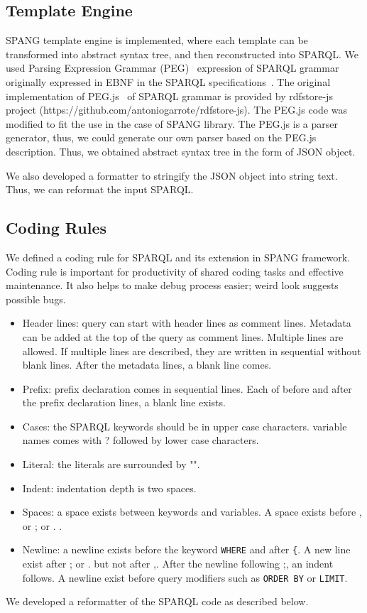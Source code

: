 \documentclass[runningheads]{llncs}
\begin{document}
\subsection{Template Engine}
SPANG template engine is implemented, where each template can be transformed into abstract syntax tree, and then reconstructed into SPARQL. 
We used Parsing Expression Grammar (PEG)~\cite{peg} expression of SPARQL grammar originally expressed in EBNF in the SPARQL specifications~\cite{sparql}. The original implementation of PEG.js~\cite{pegjs} of SPARQL grammar is provided by rdfstore-js project (https://github.com/antoniogarrote/rdfstore-js).
The PEG.js code was modified to fit the use in the case of SPANG library.
The PEG.js is a parser generator, thus, we could generate our own parser based on the PEG.js description. Thus, we obtained abstract syntax tree in the form of JSON object.

We also developed a formatter to stringify the JSON object into string text. Thus, we can reformat the input SPARQL.


\subsection{Coding Rules}
We defined a coding rule for SPARQL and its extension in SPANG framework. Coding rule is important for productivity of shared coding tasks and effective maintenance. It also helps to make debug process easier; weird look suggests possible bugs. 
\begin{itemize}
    \item Header lines: query can start with header lines as comment lines. Metadata can be added at the top of the query as comment lines. Multiple lines are allowed. If multiple lines are described, they are written in sequential without blank lines. After the metadata lines, a blank line comes.
    \item Prefix: prefix declaration comes in sequential lines. Each of before and after the prefix declaration lines, a blank line exists.
    \item Cases: the SPARQL keywords should be in upper case characters. variable names comes with ? followed by lower case characters.
    \item Literal: the literals are surrounded by "".
    \item Indent: indentation depth is two spaces.
    \item Spaces: a space exists between keywords and variables. A space exists before , or ; or . .
    \item Newline: a newline exists before the keyword \texttt{WHERE} and after \texttt{\{}. A new line exist after ; or . but not after ,. After the newline following ;, an indent follows. A newline exist before query modifiers such as \texttt{ORDER BY} or \texttt{LIMIT}.
\end{itemize}
We developed a reformatter of the SPARQL code as described below.
\end{document}

